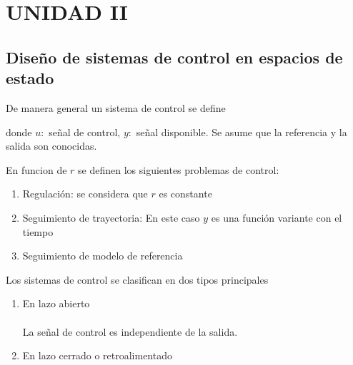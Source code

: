 \section{UNIDAD II}
\subsection{Diseño de sistemas de control en espacios de estado}

De manera general un sistema de control se define

donde \( u:\) señal de control, \(y:\) señal disponible. Se asume que la referencia y la salida son conocidas.

En funcion de \( r \) se definen los siguientes problemas de control:

\begin{enumerate}
    \item Regulación: se considera que \( r \) es constante
    \item Seguimiento de trayectoria: En este caso \( y \) es una función variante con el tiempo
    \item Seguimiento de modelo de referencia
\end{enumerate}

Los sistemas de control se clasifican en dos tipos principales
\begin{enumerate}
    \item En lazo abierto\\\\
    La señal de control es independiente de la salida.
    \item En lazo cerrado o retroalimentado
\end{enumerate}